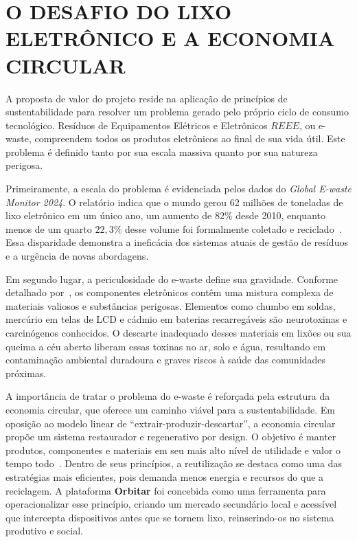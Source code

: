 \documentclass[
	12pt,				%
	openright,			%
	oneside,			%
	a4paper,			%
	english,			%
	brazil				%
	]{abntex2}
\theoremstyle{definition}
\begin{document}
\section[O DESAFIO DO LIXO ELETRÔNICO E A ECONOMIA CIRCULAR]{O DESAFIO DO LIXO ELETRÔNICO E A ECONOMIA CIRCULAR}

A proposta de valor do projeto reside na aplicação de princípios de sustentabilidade para resolver um problema gerado pelo próprio ciclo de consumo tecnológico. Resíduos de Equipamentos Elétricos e Eletrônicos \(REEE\), ou e-waste, compreendem todos os produtos eletrônicos ao final de sua vida útil. Este problema é definido tanto por sua escala massiva quanto por sua natureza perigosa.

Primeiramente, a escala do problema é evidenciada pelos dados do \textit{Global E-waste Monitor 2024}. O relatório indica que o mundo gerou 62 milhões de toneladas de lixo eletrônico em um único ano, um aumento de 82\% desde 2010, enquanto menos de um quarto \(22,3\%\) desse volume foi formalmente coletado e reciclado~\cite{forti2024}. Essa disparidade demonstra a ineficácia dos sistemas atuais de gestão de resíduos e a urgência de novas abordagens.

Em segundo lugar, a periculosidade do e-waste define sua gravidade. Conforme detalhado por~, os componentes eletrônicos contêm uma mistura complexa de materiais valiosos e substâncias perigosas. Elementos como chumbo em soldas, mercúrio em telas de LCD e cádmio em baterias recarregáveis são neurotoxinas e carcinógenos conhecidos. O descarte inadequado desses materiais em lixões ou sua queima a céu aberto liberam essas toxinas no ar, solo e água, resultando em contaminação ambiental duradoura e graves riscos à saúde das comunidades próximas.

A importância de tratar o problema do e-waste é reforçada pela estrutura da economia circular, que oferece um caminho viável para a sustentabilidade. Em oposição ao modelo linear de ``extrair-produzir-descartar'', a economia circular propõe um sistema restaurador e regenerativo por design. O objetivo é manter produtos, componentes e materiais em seu mais alto nível de utilidade e valor o tempo todo~\cite{ellen2023}. Dentro de seus princípios, a reutilização se destaca como uma das estratégias mais eficientes, pois demanda menos energia e recursos do que a reciclagem. A plataforma \textbf{Orbitar} foi concebida como uma ferramenta para operacionalizar esse princípio, criando um mercado secundário local e acessível que intercepta dispositivos antes que se tornem lixo, reinserindo-os no sistema produtivo e social.
\end{document}
